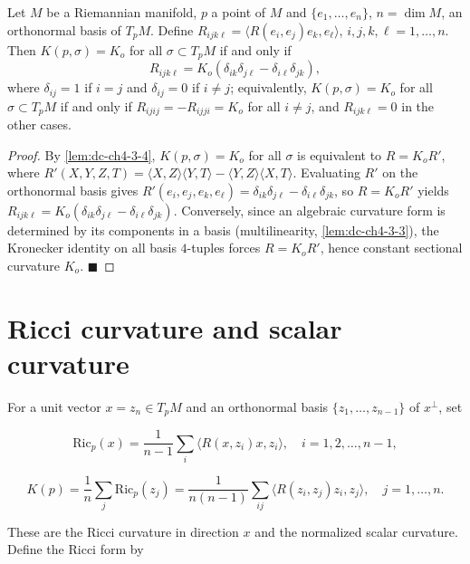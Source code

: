 \begin{corollary}
  \label{cor:dc-ch4-3-5}


  Let $M$ be a Riemannian manifold, $p$ a point of $M$ and $\{e_1,\dots,e_n\}$,
  $n=\dim M$, an orthonormal basis of $T_pM$. Define
  $R_{ijk\ell}=\langle R(e_i,e_j)e_k,e_\ell\rangle$, $i,j,k,\ell=1,\dots,n$. Then
  $K(p,\sigma)=K_o$ for all $\sigma\subset T_pM$ if and only if
  $$
  R_{ijk\ell}=K_o(\delta_{ik}\delta_{j\ell}-\delta_{i\ell}\delta_{jk}),
  $$
  where $\delta_{ij}=1$ if $i=j$ and $\delta_{ij}=0$ if $i\neq j$; equivalently,
  $K(p,\sigma)=K_o$ for all $\sigma\subset T_pM$ if and only if
  $R_{ijij}=-R_{ijji}=K_o$ for all $i\neq j$, and $R_{ijk\ell}=0$ in the other
  cases.
\end{corollary}
\begin{proof}

  \sketch
  By \cref{lem:dc-ch4-3-4}, $K(p,\sigma)=K_o$ for all $\sigma$ is equivalent to
  $R=K_oR'$, where $R'(X,Y,Z,T)=\langle X,Z\rangle\langle Y,T\rangle-\langle
  Y,Z\rangle\langle X,T\rangle$. Evaluating $R'$ on the orthonormal basis gives
  $R'(e_i,e_j,e_k,e_\ell)=\delta_{ik}\delta_{j\ell}-\delta_{i\ell}\delta_{jk}$,
  so $R=K_oR'$ yields
  $R_{ijk\ell}=K_o(\delta_{ik}\delta_{j\ell}-\delta_{i\ell}\delta_{jk})$.
  Conversely, since an algebraic curvature form is determined by its components
  in a basis (multilinearity, \cref{lem:dc-ch4-3-3}), the Kronecker identity on
  all basis $4$-tuples forces $R=K_oR'$, hence constant sectional curvature
  $K_o$. $\blacksquare$
\end{proof}

\section{Ricci curvature and scalar curvature}

For a unit vector $x=z_n\in T_pM$ and an orthonormal basis
$\{z_1,\dots,z_{n-1}\}$ of $x^\perp$, set

$$
\mathrm{Ric}_p(x)=\frac{1}{n-1}\sum_i\langle R(x,z_i)x,z_i\rangle,\quad i=1,2,\dots,n-1,
$$

$$
K(p)=\frac{1}{n}\sum_j\mathrm{Ric}_p(z_j)=\frac{1}{n(n-1)}\sum_{ij}\langle R(z_i,z_j)z_i,z_j\rangle,\quad j=1,\dots,n.
$$

These are the Ricci curvature in direction $x$ and the normalized scalar
curvature. Define the Ricci form by

